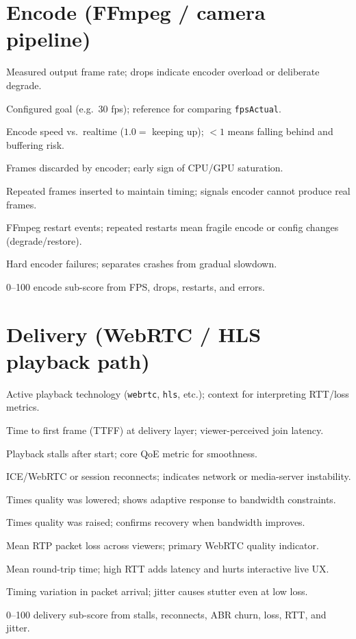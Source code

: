 \documentclass[10pt,a4paper]{article}
\newcommand{\metric}[2]{\item[\texttt{#1}] #2}
\begin{document}
\section*{Encode (FFmpeg / camera pipeline)}
\begin{description}[style=nextline, leftmargin=2.6cm, labelwidth=2.4cm]
  \metric{fpsActual}{Measured output frame rate; drops indicate encoder overload or deliberate degrade.}
  \metric{targetFps}{Configured goal (e.g.\ 30 fps); reference for comparing \texttt{fpsActual}.}
  \metric{encodeSpeedRatio}{Encode speed vs.\ realtime ($1.0 =$ keeping up); $<1$ means falling behind and buffering risk.}
  \metric{droppedFrames}{Frames discarded by encoder; early sign of CPU/GPU saturation.}
  \metric{duplicatedFrames}{Repeated frames inserted to maintain timing; signals encoder cannot produce real frames.}
  \metric{encodeRestartCount}{FFmpeg restart events; repeated restarts mean fragile encode or config changes (degrade/restore).}
  \metric{encodeErrorCount}{Hard encoder failures; separates crashes from gradual slowdown.}
  \metric{encodeHealthScore}{0--100 encode sub-score from FPS, drops, restarts, and errors.}
\end{description}

\section*{Delivery (WebRTC / HLS playback path)}
\begin{description}[style=nextline, leftmargin=2.6cm, labelwidth=2.4cm]
  \metric{deliveryMode}{Active playback technology (\texttt{webrtc}, \texttt{hls}, etc.); context for interpreting RTT/loss metrics.}
  \metric{startupTimeMs}{Time to first frame (TTFF) at delivery layer; viewer-perceived join latency.}
  \metric{rebufferCount}{Playback stalls after start; core QoE metric for smoothness.}
  \metric{reconnectCount}{ICE/WebRTC or session reconnects; indicates network or media-server instability.}
  \metric{abrStepDownCount}{Times quality was lowered; shows adaptive response to bandwidth constraints.}
  \metric{abrStepUpCount}{Times quality was raised; confirms recovery when bandwidth improves.}
  \metric{avgPacketLossPct}{Mean RTP packet loss across viewers; primary WebRTC quality indicator.}
  \metric{avgRttMs}{Mean round-trip time; high RTT adds latency and hurts interactive live UX.}
  \metric{avgJitterMs}{Timing variation in packet arrival; jitter causes stutter even at low loss.}
  \metric{deliveryHealthScore}{0--100 delivery sub-score from stalls, reconnects, ABR churn, loss, RTT, and jitter.}
\end{description}
\end{document}
